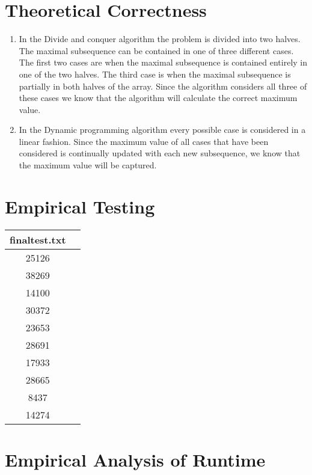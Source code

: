 \documentclass[12pt]{article}
\begin{document}
\section{Theoretical Correctness}
    \begin{enumerate}

    \item In the Divide and conquer algorithm the problem is divided into two
            halves.  The maximal subsequence can be contained in one of three
            different cases.  The first two cases are when the maximal
            subsequence is contained entirely in one of the two halves. The 
            third case is when the maximal subsequence is partially in both
            halves of the array.  Since the algorithm considers all three of
            these cases we know that the algorithm will calculate the correct
            maximum value.

    \item In the Dynamic programming algorithm every possible case is 
            considered in a linear fashion.  Since the maximum value of all
            cases that have been considered is continually updated with each
            new subsequence, we know that the maximum value will be captured.

    \end{enumerate}

\section*{Empirical Testing}

\begin{center}
\begin{tabular}{|c|c|}
\hline
finaltest.txt \\ \hline
25126 \\ \hline
38269 \\ \hline
14100 \\ \hline
30372 \\ \hline
23653 \\ \hline
28691 \\ \hline
17933 \\ \hline
28665 \\ \hline
8437 \\ \hline
14274 \\ \hline
\end{tabular}
\end{center}

\section*{Empirical Analysis of Runtime}
\end{document}
